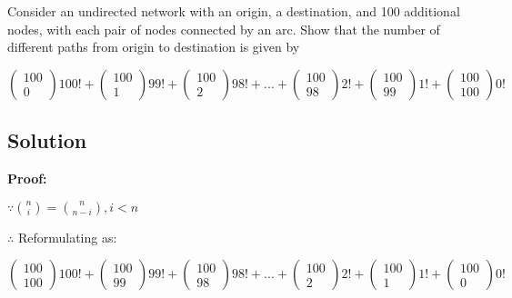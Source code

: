 \documentclass[11pt]{article}
\begin{document}
Consider an undirected network with an origin, a destination, and 100
additional nodes, with each pair of nodes connected by an arc. Show that
the number of different paths from origin to destination is given by

\[\begin{pmatrix} 100 \\ 0 \end{pmatrix} 100! +\begin{pmatrix} 100 \\ 1 \end{pmatrix} 99! +\begin{pmatrix} 100 \\ 2 \end{pmatrix} 98!+...+\begin{pmatrix} 100 \\ 98 \end{pmatrix} 2!+\begin{pmatrix} 100 \\ 99 \end{pmatrix} 1!+\begin{pmatrix} 100 \\ 100 \end{pmatrix} 0!\]

\hypertarget{solution}{%
\subsection{Solution}\label{solution}}

\textbf{Proof:}

\(\because \binom{n}{i} = \binom{n}{n-i},i<n\)

\(\therefore\) Reformulating as:

\[\begin{pmatrix} 100 \\ 100 \end{pmatrix} 100! +\begin{pmatrix} 100 \\ 99 \end{pmatrix} 99! +\begin{pmatrix} 100 \\ 98 \end{pmatrix} 98!+...+\begin{pmatrix} 100 \\ 2 \end{pmatrix} 2!+\begin{pmatrix} 100 \\ 1 \end{pmatrix} 1!+\begin{pmatrix} 100 \\ 0 \end{pmatrix} 0!\]
\end{document}
